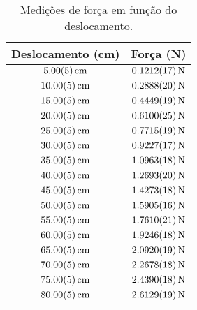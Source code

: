 \documentclass{article}
\begin{document}
\begin{table}[h]
\centering
\begin{tabular}{c c}
\hline
\textbf{Deslocamento (cm)} & \textbf{Força (N)} \\
\hline
$\SI{5.00 \pm 0.05}{\centi\meter}$ & $\SI{0.1212 \pm 0.0017}{\newton}$ \\
$\SI{10.00 \pm 0.05}{\centi\meter}$ & $\SI{0.2888 \pm 0.0020}{\newton}$ \\
$\SI{15.00 \pm 0.05}{\centi\meter}$ & $\SI{0.4449 \pm 0.0019}{\newton}$ \\
$\SI{20.00 \pm 0.05}{\centi\meter}$ & $\SI{0.6100 \pm 0.0025}{\newton}$ \\
$\SI{25.00 \pm 0.05}{\centi\meter}$ & $\SI{0.7715 \pm 0.0019}{\newton}$ \\
$\SI{30.00 \pm 0.05}{\centi\meter}$ & $\SI{0.9227 \pm 0.0017}{\newton}$ \\
$\SI{35.00 \pm 0.05}{\centi\meter}$ & $\SI{1.0963 \pm 0.0018}{\newton}$ \\
$\SI{40.00 \pm 0.05}{\centi\meter}$ & $\SI{1.2693 \pm 0.0020}{\newton}$ \\
$\SI{45.00 \pm 0.05}{\centi\meter}$ & $\SI{1.4273 \pm 0.0018}{\newton}$ \\
$\SI{50.00 \pm 0.05}{\centi\meter}$ & $\SI{1.5905 \pm 0.0016}{\newton}$ \\
$\SI{55.00 \pm 0.05}{\centi\meter}$ & $\SI{1.7610 \pm 0.0021}{\newton}$ \\
$\SI{60.00 \pm 0.05}{\centi\meter}$ & $\SI{1.9246 \pm 0.0018}{\newton}$ \\
$\SI{65.00 \pm 0.05}{\centi\meter}$ & $\SI{2.0920 \pm 0.0019}{\newton}$ \\
$\SI{70.00 \pm 0.05}{\centi\meter}$ & $\SI{2.2678 \pm 0.0018}{\newton}$ \\
$\SI{75.00 \pm 0.05}{\centi\meter}$ & $\SI{2.4390 \pm 0.0018}{\newton}$ \\
$\SI{80.00 \pm 0.05}{\centi\meter}$ & $\SI{2.6129 \pm 0.0019}{\newton}$ \\
\hline
\end{tabular}
\caption{Medições de força em função do deslocamento.}
\label{tab:forca_deslocamento}
\end{table}
\end{document}
